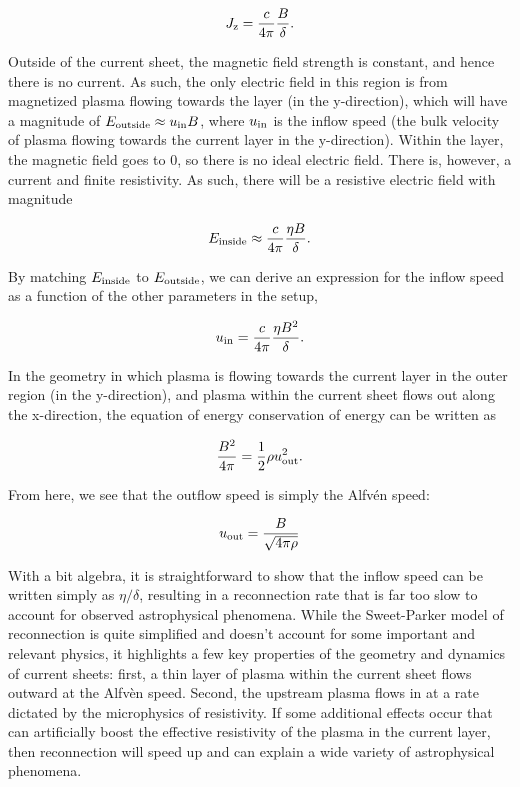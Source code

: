\begin{equation}
	J_{\rm{z}} = \frac{c}{4 \pi}\frac{B}{\delta}.
\end{equation}    

Outside of the current sheet, the magnetic field strength is constant, and hence there is no current.  As such, the only electric field in this region is from magnetized plasma flowing towards the layer (in the y-direction), which will have a magnitude of $E_{\rm{outside}} \approx u_{\rm{in}}B$, where $u_{\rm{in}}$ is the inflow speed (the bulk velocity of plasma flowing towards the current layer in the y-direction).  Within the layer, the magnetic field goes to 0, so there is no ideal electric field.  There is, however, a current and finite resistivity.  As such, there will be a resistive electric field with magnitude 

\begin{equation}
E_{\rm{inside}} \approx \frac{c}{4\pi}\frac{\eta B}{\delta}.
\end{equation}

By matching $E_{\rm{inside}}$ to $E_{\rm{outside}}$, we can derive an expression for the inflow speed as a function of the other parameters in the setup,

\begin{equation}
	u_{\rm{in}} = \frac{c}{4 \pi} \frac{\eta B^2}{\delta}.
\end{equation}

In the geometry in which plasma is flowing towards the current layer in the outer region (in the y-direction), and plasma within the current sheet flows out along the x-direction, the equation of energy conservation of energy can be written as

\begin{equation}
	\frac{B^2}{4 \pi} = \frac{1}{2}\rho u_{\rm{out}}^2.
\end{equation}

From here, we see that the outflow speed is simply the Alfv\'en speed: 

\begin{equation}
	u_{\rm{out}}=\frac{B}{\sqrt{4\pi \rho}}
\end{equation}

With a bit algebra, it is straightforward to show that the inflow speed can be written simply as $\eta/\delta$, resulting in a reconnection rate that is far too slow to account for observed astrophysical phenomena.  While the Sweet-Parker model of reconnection is quite simplified and doesn't account for some important and relevant physics, it highlights a few key properties of the geometry and dynamics of current sheets: first, a thin layer of plasma within the current sheet flows outward at the Alfv\`en speed.  Second, the upstream plasma flows in at a rate dictated by the microphysics of resistivity.  If some additional effects occur that can artificially boost the effective resistivity of the plasma in the current layer, then reconnection will speed up and can explain a wide variety of astrophysical phenomena. 

